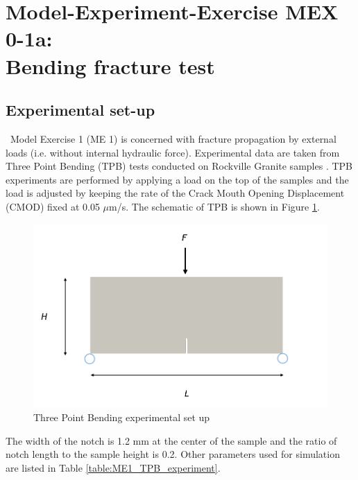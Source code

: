\section[MEX 0-1a: Bending fracture test (crystalline)]{Model-Experiment-Exercise MEX 0-1a:\\Bending fracture test}
\label{sec:mex01}
\subsection{Experimental set-up}
~Model Exercise 1 (ME 1) is concerned with fracture propagation by external loads (i.e. without internal hydraulic force). Experimental data are taken from Three Point Bending (TPB) tests conducted on Rockville Granite samples \cite{Tarokh2016161}. TPB experiments are performed by applying a load on the top of the samples and the load is adjusted by keeping the rate of the Crack Mouth Opening Displacement (CMOD) fixed at 0.05 $\mu$m/s.
The schematic of TPB is shown in Figure \ref{fig:ME1_TPB_experiment}.

\begin{figure}[!ht]
\centering
\includegraphics[width=1\textwidth]{figures/TPB_exp.png}
\caption{Three Point Bending experimental set up}
\label{fig:ME1_TPB_experiment}
\end{figure}

The width of the notch is 1.2 mm at the center of the sample and the ratio of notch length to the sample height is 0.2. 
Other parameters used for simulation are listed in Table \ref{table:ME1_TPB_experiment}.

